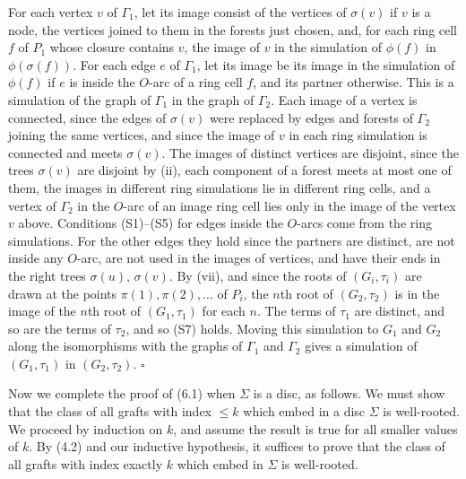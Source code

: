 {For each vertex $v$ of $\Gamma_1$, let its image consist of the vertices of $\sigma(v)$ if $v$ is a
node, the vertices joined to them in the forests just chosen, and, for each ring cell $f$ of $P_1$
whose closure contains $v$, the image of $v$ in the simulation of $\phi(f)$ in $\phi(\sigma(f))$. For
each edge $e$ of $\Gamma_1$, let its image be its image in the simulation of $\phi(f)$ if $e$ is
inside the $O$-arc of a ring cell $f$, and its partner otherwise. This is a simulation of the graph
of $\Gamma_1$ in the graph of $\Gamma_2$. Each image of a vertex is connected, since the edges of
$\sigma(v)$ were replaced by edges and forests of $\Gamma_2$ joining the same vertices, and since
the image of $v$ in each ring simulation is connected and meets $\sigma(v)$. The images of distinct
vertices are disjoint, since the trees $\sigma(v)$ are disjoint by (ii), each component of a forest
meets at most one of them, the images in different ring simulations lie in different ring cells,
and a vertex of $\Gamma_2$ in the $O$-arc of an image ring cell lies only in the image of the
vertex $v$ above. Conditions (S1)--(S5) for edges inside the $O$-arcs come from the ring
simulations. For the other edges they hold since the partners are distinct, are not inside any
$O$-arc, are not used in the images of vertices, and have their ends in the right trees
$\sigma(u)$, $\sigma(v)$. By (vii), and since the roots of $(G_i, \tau_i)$ are drawn at the points
$\pi(1), \pi(2), \dots$ of $P_i$, the $n$th root of $(G_2, \tau_2)$ is in the image of the $n$th
root of $(G_1, \tau_1)$ for each $n$. The terms of $\tau_1$ are distinct, and so are the terms of
$\tau_2$, and so (S7) holds. Moving this simulation to $G_1$ and $G_2$ along the isomorphisms with
the graphs of $\Gamma_1$ and $\Gamma_2$ gives a simulation of $(G_1, \tau_1)$ in
$(G_2, \tau_2)$.}
$\square$


Now we complete the proof of (6.1) when $\Sigma$ is a disc, as follows. We must show that the class of all grafts with index $\le k$ which embed in a disc $\Sigma$ is well-rooted. We proceed by induction on $k$, and assume the result is true for all smaller values of $k$. By (4.2) and our inductive hypothesis, it suffices to prove that the class of all grafts with index exactly $k$ which embed in $\Sigma$ is well-rooted.

